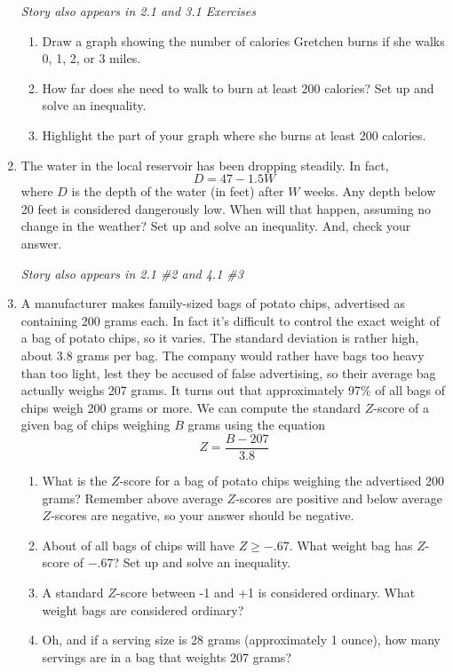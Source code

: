 \begin{enumerate}
\hfill \emph{Story also appears in 2.1 and 3.1 Exercises}
\begin{enumerate}
\item Draw a graph showing the number of calories Gretchen burns if she walks 0, 1, 2, or 3 miles.
\item How far does she need to walk to burn at least 200 calories? Set up and solve an inequality.
\item Highlight the part of your graph where she burns at least 200 calories.
\end{enumerate}

\item The water in the local reservoir has been dropping steadily.  In fact, $$D = 47-1.5W$$ where $D$ is the depth of the water (in feet) after $W$ weeks.  Any depth below 20 feet is considered dangerously low.  When will that happen, assuming no change in the weather?  Set up and solve an inequality.  And, check your answer.

\hfill \emph{Story also appears in 2.1 \#2 and 4.1 \#3}

\item A manufacturer makes family-sized bags of potato chips, advertised as containing 200 grams each.  In fact it's difficult to control the exact weight of a bag of potato chips, so it varies. The standard deviation is rather high, about 3.8 grams per bag.  The company would rather have bags too heavy than too light, lest they be accused of false advertising, so their average bag actually weighs 207 grams.  It turns out that approximately 97\% of all bags of chips weigh 200 grams or more.  We can compute the standard $Z$-score of a given bag of chips weighing $B$ grams using the equation $$Z = \frac{B-207}{3.8}$$
\begin{enumerate}
\item What is the $Z$-score for a bag of potato chips weighing the advertised 200 grams?  Remember above average $Z$-scores are positive and below average $Z$-scores are negative, so your answer should be negative.  
\item About  of all bags of chips will have $Z \ge -.67$.  What weight bag has $Z$-score of $-.67$?  Set up and solve an inequality.
\item A standard $Z$-score between -1 and +1 is considered ordinary.  What weight bags are considered ordinary? 
\item Oh, and if a serving size is 28 grams (approximately 1 ounce), how many servings are in a bag that weights 207 grams?
\end{enumerate}


\end{enumerate}
